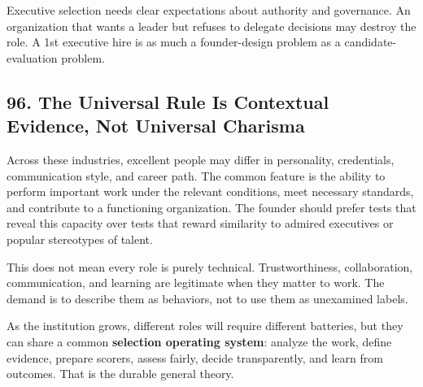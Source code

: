 Executive selection needs clear expectations about authority and governance. An organization that wants a leader but refuses to delegate decisions may destroy the role. A 1st executive hire is as much a founder-design problem as a candidate-evaluation problem.

\subsection*{96. The Universal Rule Is Contextual Evidence, Not Universal Charisma}

Across these industries, excellent people may differ in personality, credentials, communication style, and career path. The common feature is the ability to perform important work under the relevant conditions, meet necessary standards, and contribute to a functioning organization. The founder should prefer tests that reveal this capacity over tests that reward similarity to admired executives or popular stereotypes of talent.

This does not mean every role is purely technical. Trustworthiness, collaboration, communication, and learning are legitimate when they matter to work. The demand is to describe them as behaviors, not to use them as unexamined labels.

As the institution grows, different roles will require different batteries, but they can share a common \textbf{selection operating system}: analyze the work, define evidence, prepare scorers, assess fairly, decide transparently, and learn from outcomes. That is the durable general theory.
